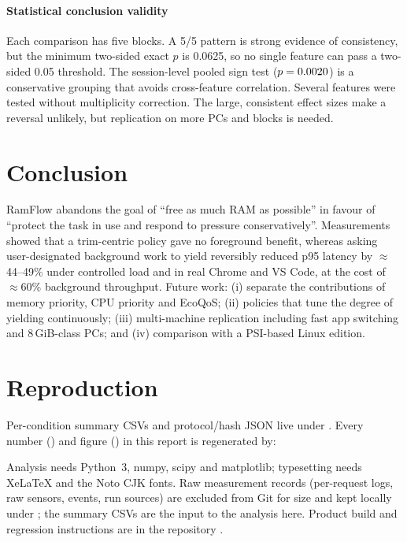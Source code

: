 \documentclass[11pt]{article}
\begin{document}
\paragraph{Statistical conclusion validity}
Each comparison has five blocks. A 5/5 pattern is strong evidence of consistency, but the minimum two-sided exact $p$ is 0.0625, so no single feature can pass a two-sided 0.05 threshold. The session-level pooled sign test ($p=0.0020$) is a conservative grouping that avoids cross-feature correlation. Several features were tested without multiplicity correction. The large, consistent effect sizes make a reversal unlikely, but replication on more PCs and blocks is needed.

\section{Conclusion}
\label{sec:conclusion}

RamFlow abandons the goal of ``free as much RAM as possible'' in favour of ``protect the task in use and respond to pressure conservatively''. Measurements showed that a trim-centric policy gave no foreground benefit, whereas asking user-designated background work to yield reversibly reduced p95 latency by $\approx$44--49\% under controlled load and in real Chrome and VS Code, at the cost of $\approx$60\% background throughput. Future work: (i) separate the contributions of memory priority, CPU priority and EcoQoS; (ii) policies that tune the degree of yielding continuously; (iii) multi-machine replication including fast app switching and 8\,GiB-class PCs; and (iv) comparison with a PSI-based Linux edition.

{\small

}

\appendix
\section{Reproduction}
\label{app:repro}
Per-condition summary CSVs and protocol/hash JSON live under . Every number () and figure () in this report is regenerated by:
\begin{center}
\small{}\qquad{}
\end{center}
Analysis needs Python~3, numpy, scipy and matplotlib; typesetting needs XeLaTeX and the Noto CJK fonts. Raw measurement records (per-request logs, raw sensors, events, run sources) are excluded from Git for size and kept locally under ; the summary CSVs are the input to the analysis here. Product build and regression instructions are in the repository .
\end{document}
